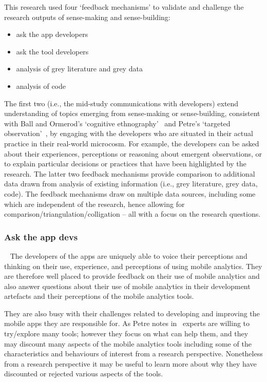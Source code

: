 This research used four `feedback mechanisms' to validate and challenge the research outputs of sense-making and sense-building:

\begin{itemize}
\itemsep0em
\item ask the app developers
\item ask the tool developers
\item analysis of grey literature and grey data
\item analysis of code
\end{itemize}

The first two (i.e., the mid-study communications with developers) extend understanding of topics emerging from sense-making or sense-building, consistent with Ball and Ormerod's `cognitive ethnography'~ and Petre's `targeted observation'~, by engaging with the developers who are situated in their actual practice in their real-world microcosm.  For example, the developers can be asked about their experiences, perceptions or reasoning about emergent observations, or to explain particular decisions or practices that have been highlighted by the research. The latter two feedback mechanisms provide comparison to additional data drawn from analysis of existing information (i.e., grey literature, grey data, code).  The feedback mechanisms draw on multiple data sources, including some which are independent of the research, hence allowing for comparison/triangulation/colligation -- all with a focus on the research questions.

\subsubsection{Ask the app devs}~\label{section-ask-the-app-devs-research-method}
The developers of the apps are uniquely able to voice their perceptions and thinking on their use, experience, and perceptions of using mobile analytics. They are therefore well placed to provide feedback on their use of mobile analytics and also answer questions about their use of mobile analytics in their development artefacts and their perceptions of the mobile analytics tools.

They are also busy with their challenges related to developing and improving the mobile apps they are responsible for. As Petre notes in~ experts are willing to try/explore many tools; however they focus on what can help them, and they may discount many aspects of the mobile analytics tools including some of the characteristics and behaviours of interest from a research perspective. Nonetheless from a research perspective it may be useful to learn more about why they have discounted or rejected various aspects of the tools. 

